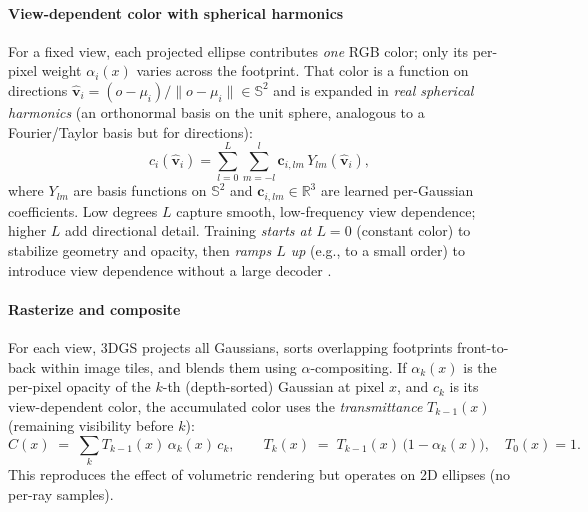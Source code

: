 \begin{enrichment}
\begin{enrichment}
\begin{enrichment}
        \paragraph{View-dependent color with spherical harmonics}
        For a fixed view, each projected ellipse contributes \emph{one} RGB color; only its per-pixel weight $\alpha_i(x)$ varies across the footprint.  
        That color is a function on directions $\hat{\mathbf{v}}_i=(o-\mu_i)/\|o-\mu_i\|\in\mathbb{S}^2$ and is expanded in \emph{real spherical harmonics} (an orthonormal basis on the unit sphere, analogous to a Fourier/Taylor basis but for directions):
        \[
        c_i(\hat{\mathbf{v}}_i)=\sum_{l=0}^{L}\sum_{m=-l}^{l}\mathbf{c}_{i,lm}\,Y_{lm}(\hat{\mathbf{v}}_i),
        \]
        where $Y_{lm}$ are basis functions on $\mathbb{S}^2$ and $\mathbf{c}_{i,lm}\!\in\!\mathbb{R}^3$ are learned per-Gaussian coefficients.  
        Low degrees $L$ capture smooth, low-frequency view dependence; higher $L$ add directional detail.  
        Training \emph{starts at $L{=}0$} (constant color) to stabilize geometry and opacity, then \emph{ramps $L$ up} (e.g., to a small order) to introduce view dependence without a large decoder \cite{kerbl2023_3dgaussiansplatting}.
        
        \paragraph{Rasterize and composite}
        For each view, 3DGS projects all Gaussians, sorts overlapping footprints front-to-back within image tiles, and blends them using $\alpha$-compositing. 
        If $\alpha_k(x)$ is the per-pixel opacity of the $k$-th (depth-sorted) Gaussian at pixel $x$, and $c_k$ is its view-dependent color, the accumulated color uses the \emph{transmittance} $T_{k-1}(x)$ (remaining visibility before $k$):
        \[
        C(x)\;=\;\sum_k T_{k-1}(x)\,\alpha_k(x)\,c_k,\qquad
        T_k(x)\;=\;T_{k-1}(x)\,\bigl(1-\alpha_k(x)\bigr),\quad T_0(x)=1.
        \]
        This reproduces the effect of volumetric rendering but operates on 2D ellipses (no per-ray samples).
        

\end{enrichment}
\end{enrichment}
\end{enrichment}
